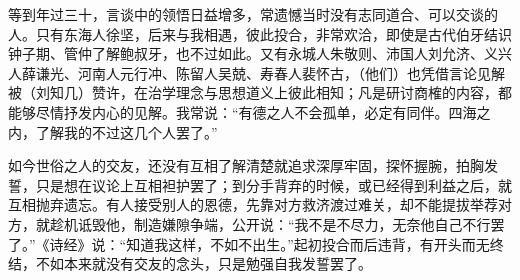 \documentclass[11pt,a4paper]{ctexart}
\begin{document}

\par\vspace{0.5em}

\begin{translation}
等到年过三十，言谈中的领悟日益增多，常遗憾当时没有志同道合、可以交谈的人。只有东海人徐坚，后来与我相遇，彼此投合，非常欢洽，即使是古代伯牙结识钟子期、管仲了解鲍叔牙，也不过如此。又有永城人朱敬则、沛国人刘允济、义兴人薛谦光、河南人元行冲、陈留人吴兢、寿春人裴怀古，（他们）也凭借言论见解被（刘知几）赞许，在治学理念与思想道义上彼此相知；凡是研讨商榷的内容，都能够尽情抒发内心的见解。我常说：“有德之人不会孤单，必定有同伴。四海之内，了解我的不过这几个人罢了。”
\end{translation}

\begin{translation}
如今世俗之人的交友，还没有互相了解清楚就追求深厚牢固，探怀握腕，拍胸发誓，只是想在议论上互相袒护罢了；到分手背弃的时候，或已经得到利益之后，就互相抛弃遗忘。有人接受别人的恩德，先靠对方救济渡过难关，却不能提拔举荐对方，就趁机诋毁他，制造嫌隙争端，公开说：“我不是不尽力，无奈他自己不行罢了。”《诗经》说：“知道我这样，不如不出生。”起初投合而后违背，有开头而无终结，不如本来就没有交友的念头，只是勉强自我发誓罢了。
\end{translation}
\end{document}
